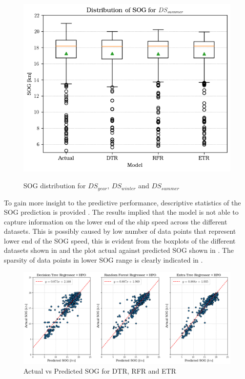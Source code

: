 \begin{figure}[ht]
\begin{minipage}[b]{0.32\textwidth}
    \label{fig:boxplot_dswinter}
\end{minipage}%
\hfill
\begin{minipage}[b]{0.32\textwidth}
    \centering
    \includegraphics[width=\textwidth]{02_figures/sog_pred_summer.png}
    \label{fig:boxplot_dssummer}
\end{minipage}

\caption{SOG distribution for $DS_{year}$, $DS_{winter}$ and $DS_{summer}$}
\label{fig:boxplot_sogPred_overall}
\end{figure}  

To gain more insight to the predictive performance, descriptive statistics of the SOG prediction is provided . The results implied that the model is not able to capture information on the lower end of the ship speed across the different datasets. This is possibly caused by low number of data points that represent lower end of the SOG speed, this is evident from the boxplots of the different datasets shown in  and the plot actual against predicted SOG shown in . The sparsity of data points in lower SOG range is clearly indicated in .\\

\begin{figure}[h]
    \centering
        \includegraphics[width=.9\textwidth]{02_figures/pred_vs_act_all_tree.png}
        \caption{Actual vs Predicted SOG for DTR, RFR and ETR}
        \label{fig:pred_vs_act_SOG}
\end{figure}

